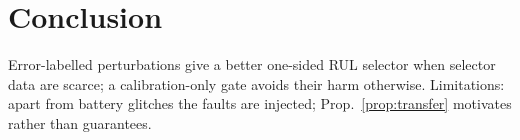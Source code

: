 \documentclass{esannV2}
\begin{document}
\section{Conclusion}
Error-labelled perturbations give a better one-sided RUL selector when selector data are scarce; a calibration-only gate avoids their harm otherwise. Limitations: apart from battery glitches the faults are injected; Prop.~\ref{prop:transfer} motivates rather than guarantees.

\begin{scriptsize}


\end{scriptsize}
\end{document}
